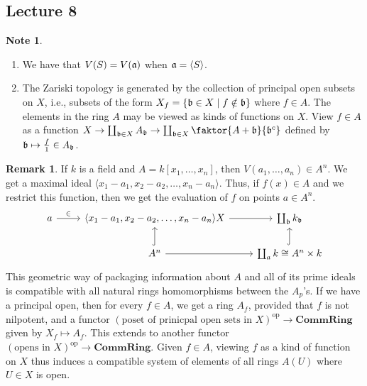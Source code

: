 \documentclass[10pt,letterpaper,cm]{nupset}
\theoremstyle{definition}
\newtheorem{note}{Note}
\newtheorem{remark}{Remark}
\newcommand{\1}{\mathbf{1}}
\newcommand{\0}{\vec 0}
\DeclareMathOperator{\op}{op}
\begin{document}
\subsection{Lecture 8}

\begin{note} $ $
\begin{enumerate}
\item We have that $V(S) = V(\frak{a})$ when $\frak{a} = \langle S \rangle $.
\item The Zariski topology is generated by the collection of principal open subsets on $X$, i.e., subsets of the form $X_f= \{\frak{b} \in X \mid  f\notin \frak{b} \}$ where $f\in A$. The elements in the ring $A$ may be viewed as kinds of functions on $X$. View $f\in A$ as a function $X \to \coprod_{\frak{b} \in X} A_{\frak{b}} \to \coprod_{\frak{b} \in X} \faktor{A+{\frak{b}}}{\frak{b}^c}$ defined by $\frak{b} \mapsto \frac{f}{1} \in A_{\frak{b}}$.
\end{enumerate}
\end{note}

\begin{remark}
If $k$ is a field and $A = k[x_1, \ldots, x_n]$, then $V(a_1, \ldots, a_n) \in A^n$. We get a maximal ideal $\langle x_1 - a_1, x_2 -a_2, \ldots, x_n-a_n \rangle$. Thus, if $f(x) \in A$ and we restrict this function, then we get the evaluation of $f$ on points $a\in A^n$.
\[
\begin{tikzcd}
a \arrow[r, "\in"] & {\langle x_1 - a_1, x_2 -a_2, \ldots, x_n-a_n \rangle X} \arrow[r] & \coprod_{\frak{b}} k_{\frak{b}} \\
 & A^n \arrow[r] \arrow[u, hook] & \coprod_{a} k \cong A^n \times k \arrow[u, hook]
\end{tikzcd}
\] 
This geometric way of packaging information about $A$ and all of its prime ideals is compatible with all natural rings homomorphisms between the $A_p$'s. If we have  a principal open, then for every $f\in A$, we get a ring $A_f$, provided that $f$ is not nilpotent, and a functor $(\text{poset of prinicpal open sets in } X)^{\op} \to \mathbf{CommRing}$ given by $X_f \mapsto A_f$. This extends to another functor $(\text{opens in } X)^{\op} \to \mathbf{CommRing}$.  Given $f\in A$, viewing $f$ as a kind of function on $X$ thus induces a compatible system of elements of all rings $A(U)$ where $U\in X$ is open. 
\end{remark}
\end{document}
